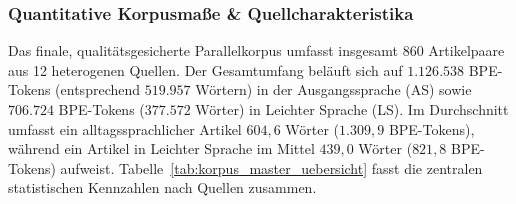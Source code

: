 \subsubsection{Quantitative Korpusmaße \& Quellcharakteristika}
\label{sec:korpusmasse_uebersicht}

Das finale, qualitätsgesicherte Parallelkorpus umfasst insgesamt $860$ Artikelpaare aus 12 heterogenen Quellen. Der Gesamtumfang beläuft sich auf $1.126.538$ BPE-Tokens (entsprechend $519.957$ Wörtern) in der Ausgangssprache (AS) sowie $706.724$ BPE-Tokens ($377.572$ Wörter) in Leichter Sprache (LS). Im Durchschnitt umfasst ein alltagssprachlicher Artikel $604{,}6$ Wörter ($1.309{,}9$ BPE-Tokens), während ein Artikel in Leichter Sprache im Mittel $439{,}0$ Wörter ($821{,}8$ BPE-Tokens) aufweist. Tabelle~\ref{tab:korpus_master_uebersicht} fasst die zentralen statistischen Kennzahlen nach Quellen zusammen.


